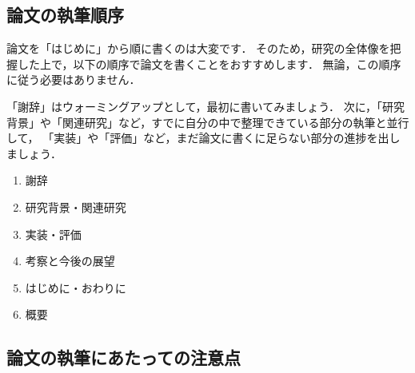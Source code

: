 \subsection{論文の執筆順序}
論文を「はじめに」から順に書くのは大変です．
そのため，研究の全体像を把握した上で，以下の順序で論文を書くことをおすすめします．
無論，この順序に従う必要はありません．

「謝辞」はウォーミングアップとして，最初に書いてみましょう．
次に，「研究背景」や「関連研究」など，すでに自分の中で整理できている部分の執筆と並行して，
「実装」や「評価」など，まだ論文に書くに足らない部分の進捗を出しましょう．

\begin{enumerate}
    \item 謝辞
    \item 研究背景・関連研究
    \item 実装・評価
    \item 考察と今後の展望
    \item はじめに・おわりに
    \item 概要
\end{enumerate}

\subsection{論文の執筆にあたっての注意点}
